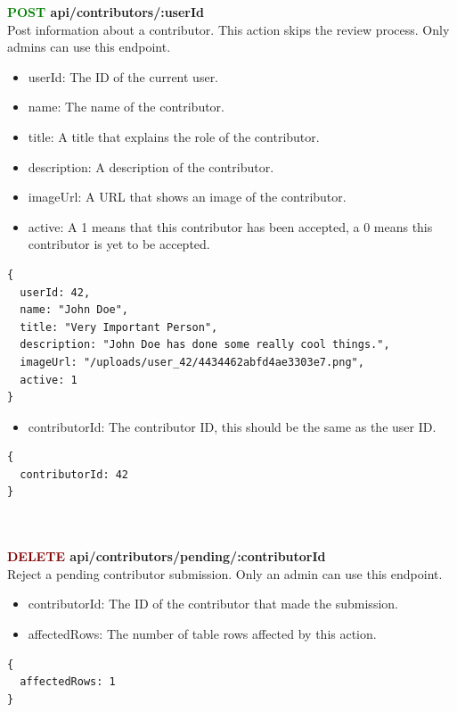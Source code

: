 \documentclass[onecolumn, draftclsnofoot,10pt, compsoc, usenames, dvipsnames]{IEEEtran}
\begin{document}
\noindent
\textbf{\textcolor{Green}{POST} api/contributors/:userId} \\
Post information about a contributor. This action skips the review process. Only admins can use this endpoint.
\begin{itemize}
    \item userId: The ID of the current user.
    \item name: The name of the contributor.
    \item title: A title that explains the role of the contributor.
    \item description: A description of the contributor.
    \item imageUrl: A URL that shows an image of the contributor.
    \item active: A 1 means that this contributor has been accepted, a 0 means this contributor is yet to be accepted.
\end{itemize}
\begin{lstlisting}[caption=Example Request File]
{
  userId: 42,
  name: "John Doe",
  title: "Very Important Person",
  description: "John Doe has done some really cool things.",
  imageUrl: "/uploads/user_42/4434462abfd4ae3303e7.png",
  active: 1
}
\end{lstlisting}
\begin{itemize}
    \item contributorId: The contributor ID, this should be the same as the user ID.
\end{itemize}
\begin{lstlisting}[caption=Example Response]
{ 
  contributorId: 42
}
\end{lstlisting}
\\~\\


\noindent
\textbf{\textcolor{Maroon}{DELETE} api/contributors/pending/:contributorId} \\
Reject a pending contributor submission. Only an admin can use this endpoint.
\begin{itemize}
  \item contributorId: The ID of the contributor that made the submission.
  \item affectedRows: The number of table rows affected by this action.
\end{itemize}
\begin{lstlisting}[caption=Example Response]
{ 
  affectedRows: 1
}
\end{lstlisting}
\\~\\
\end{document}
